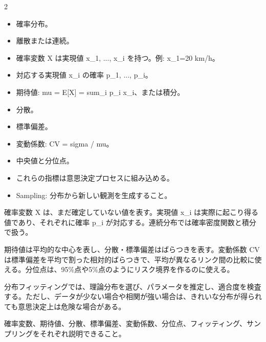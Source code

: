 \clearpage



\vspace{1.5mm}

\begin{multicols}{2}

\footnotesize

\raggedcolumns


\begin{itemize}
\item 確率分布。
\item 離散または連続。
\item 確率変数 X は実現値 x\_1, ..., x\_i を持つ。例: x\_1=20 km/h。
\item 対応する実現値 x\_i の確率 p\_1, ..., p\_i。
\item 期待値: mu = E[X] = sum\_i p\_i x\_i、または積分。
\item 分散。
\item 標準偏差。
\item 変動係数: CV = sigma / mu。
\item 中央値と分位点。
\item これらの指標は意思決定プロセスに組み込める。
\item Sampling: 分布から新しい観測を生成すること。
\end{itemize}

確率変数 X は、まだ確定していない値を表す。実現値 x\_i は実際に起こり得る値であり、それぞれに確率 p\_i が対応する。連続分布では確率密度関数と積分で扱う。\par

期待値は平均的な中心を表し、分散・標準偏差はばらつきを表す。変動係数 CV は標準偏差を平均で割った相対的ばらつきで、平均が異なるリンク間の比較に使える。分位点は、95\%点や5\%点のようにリスク境界を作るのに使える。\par

分布フィッティングでは、理論分布を選び、パラメータを推定し、適合度を検査する。ただし、データが少ない場合や相関が強い場合は、きれいな分布が得られても意思決定上は危険な場合がある。\par

確率変数、期待値、分散、標準偏差、変動係数、分位点、フィッティング、サンプリングをそれぞれ説明できること。\par


\end{multicols}
